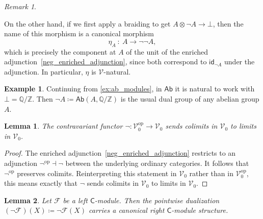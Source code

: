 \documentclass[11pt,onecolumn]{article}
\newcommand{\Z}{\mathbb{Z}}
\newcommand{\Q}{\mathbb{Q}}
\newcommand{\id}{\mathsf{id}}
\newcommand{\cV}{\mathscr{V}}
\newcommand{\cC}{\mathsf{C}}
\newcommand{\op}{\mathrm{op}}
\newcommand{\Ab}{\mathsf{Ab}}
\theoremstyle{plain}
\newtheorem{lem}[lem]{Lemma}
\theoremstyle{remark}
\newtheorem{remark}[remark]{Remark}
\theoremstyle{definition}
\newtheorem{example}[example]{Example}
\begin{document}
\begin{remark}
\begin{enumerate}
			On the other hand, if we first apply a braiding to get $A \otimes \neg A \to \bot$, 
			then the name of this morphism is a canonical morphism
				\begin{equation}
					\label{eta_double_dual}
					\eta_A \: : \: A \longrightarrow \neg\neg A,
				\end{equation}
				which is precisely the component at $A$ of the unit of the enriched adjunction~\eqref{neg_enriched_adjunction}, since both correspond to $\id_{\neg A}$ under the adjunction.
				In particular, $\eta$ is $\cV$-natural.
	\end{enumerate}
\end{remark}

\begin{example}
	Continuing from \cref{ex:ab_modules}, in $\Ab$ it is natural to work with $\bot = \Q/\Z$.
	Then $\neg A \coloneqq \Ab(A, \Q/\Z)$ is the usual dual group of any abelian group $A$.
\end{example}

\begin{lem}
	\label{lem:neg_colimits_to_limits}
	The contravariant functor $\neg \colon \cV_0^\op \to \cV_0$
	sends colimits in $\cV_0$ to limits in $\cV_0$.
\end{lem}

\begin{proof}
	The enriched adjunction~\eqref{neg_enriched_adjunction} restricts to an adjunction $\neg^\op \dashv \neg$ between the underlying ordinary categories.
	It follows that $\neg^\op$ preserves colimits.
	Reinterpreting this statement in $\cV_0$ rather than in $\cV_0^\op$, this means exactly that $\neg$ sends colimits in $\cV_0$ to limits in $\cV_0$.
\end{proof}

\begin{lem}
	\label{lem:neg_op_module}
	Let $\mathcal{F}$ be a left $\cC$-module.
	Then the pointwise dualization $(\neg \mathcal{F})(X) \coloneqq \neg\mathcal{F}(X)$
	carries a canonical right $\cC$-module structure.
\end{lem}
\end{document}
